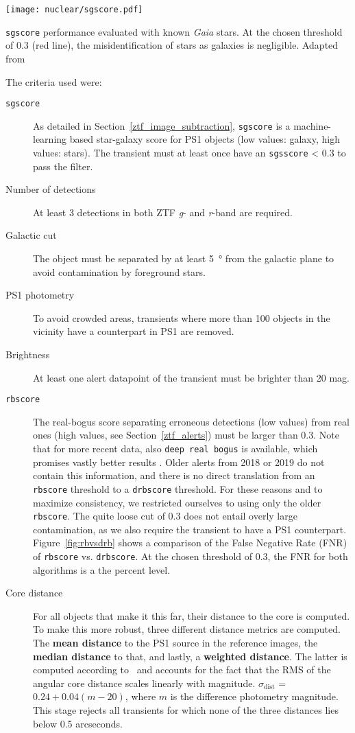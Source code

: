 \begin{marginfigure}
    \texttt{[image: nuclear/sgscore.pdf]}
    \caption[\texttt{sgscore} performance]{\texttt{sgscore} performance evaluated with known \textit{Gaia} stars. At the chosen threshold of 0.3 (red line), the misidentification of stars as galaxies is negligible. Adapted from~\cite{Tachibana2018}}
\end{marginfigure}

The criteria used were:
\begin{description}
    \item[\texttt{sgscore}] As detailed in Section~\ref{ztf_image_subtraction}, \texttt{sgscore} is a machine-learning based star-galaxy score for PS1 objects (low values: galaxy, high values: stars). The transient must at least once have an \texttt{sgsscore} < 0.3 to pass the filter.
    \item[Number of detections] At least 3 detections in both ZTF \textit{g}- and \textit{r}-band are required.
    \item[Galactic cut] The object must be separated by at least \SI{5}{\degree} from the galactic plane to avoid contamination by foreground stars.
    \item[PS1 photometry] To avoid crowded areas, transients where more than 100 objects in the vicinity have a counterpart in PS1 are removed.
    \item[Brightness] At least one alert datapoint of the transient must be brighter than 20 mag.
    \item[\texttt{rbscore}] The real-bogus score separating erroneous detections (low values) from real ones (high values, see Section~\ref{ztf_alerts}) must be larger than 0.3. Note that for more recent data, also \texttt{deep real bogus} is available, which promises vastly better results . Older alerts from 2018 or 2019 do not contain this information, and there is no direct translation from an \texttt{rbscore} threshold to a \texttt{drbscore} threshold. For these reasons and to maximize consistency, we restricted ourselves to using only the older \texttt{rbscore}. The quite loose cut of 0.3 does not entail overly large contamination, as we also require the transient to have a PS1 counterpart. Figure~\ref{fig:rbvsdrb} shows a comparison of the False Negative Rate (FNR) of \texttt{rbscore} vs. \texttt{drbscore}. At the chosen threshold of $0.3$, the FNR for both algorithms is a the percent level.
    \item[Core distance] For all objects that make it this far, their distance to the core is computed. To make this more robust, three different distance metrics are computed. The \textbf{mean distance} to the PS1 source in the reference images, the \textbf{median distance} to that, and lastly, a \textbf{weighted distance}. The latter is computed according to~ and accounts for the fact that the RMS of the angular core distance scales linearly with magnitude. $\sigma_\text{dist}$ = $0.24 + 0.04(m-20)$, where $m$ is the difference photometry magnitude. This stage rejects all transients for which none of the three distances lies below 0.5 arcseconds.
\end{description}

